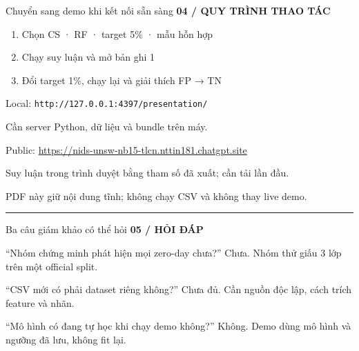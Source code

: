 \documentclass[17pt,aspectratio=169]{beamer}
\newcommand{\eyebrow}[1]{{\small\color{green}\bfseries #1}\par\vspace{2mm}}
\newcommand{\takeaway}[1]{\vfill{\color{green}\rule{\linewidth}{.5pt}}\par\vspace{1mm}{\small #1}}
\begin{document}
\begin{frame}{Chuyển sang demo khi kết nối sẵn sàng}
\eyebrow{04 / QUY TRÌNH THAO TÁC}
\begin{enumerate}
\item Chọn CS · RF · target 5\% · mẫu hỗn hợp
\item Chạy suy luận và mở bản ghi 1
\item Đổi target 1\%, chạy lại và giải thích FP → TN
\end{enumerate}
\vspace{3mm}
{\small Local: \texttt{http://127.0.0.1:4397/presentation/}\par
Cần server Python, dữ liệu và bundle trên máy.\par\vspace{2mm}
Public: \url{https://nids-unsw-nb15-tlcn.nttin181.chatgpt.site}\par
Suy luận trong trình duyệt bằng tham số đã xuất; cần tải lần đầu.\par
PDF này giữ nội dung tĩnh; không chạy CSV và không thay live demo.}
\takeaway{Khi mất mạng, dùng local đã mở sẵn hoặc ví dụ PDF. Kết nối HDMI vẫn cần thử trực tiếp tại phòng báo cáo.}
\end{frame}

\begin{frame}{Ba câu giám khảo có thể hỏi}
\eyebrow{05 / HỎI ĐÁP}
\begin{block}{“Nhóm chứng minh phát hiện mọi zero-day chưa?”}
Chưa. Nhóm thử giấu 3 lớp trên một official split.
\end{block}
\begin{block}{“CSV mới có phải dataset riêng không?”}
Chưa đủ. Cần nguồn độc lập, cách trích feature và nhãn.
\end{block}
\begin{block}{“Mô hình có đang tự học khi chạy demo không?”}
Không. Demo dùng mô hình và ngưỡng đã lưu, không fit lại.
\end{block}
\end{frame}
\end{document}
